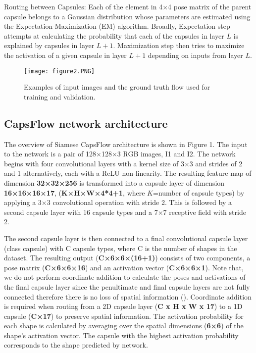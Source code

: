 \documentclass[11pt]{article}
\begin{document}
Routing between Capsules: Each of the element in
4×4 pose matrix of the parent capsule belongs to a Gaussian distribution whose parameters are estimated using the
Expectation-Maximization (EM) algorithm. Broadly, Expectation step attempts at calculating the probability that
each of the capsules in layer \(L\) is explained by capsules in
layer \(L + 1\). Maximization step then tries to maximize the
activation of a given capsule in layer \(L + 1\) depending on
inputs from layer \(L\).


\begin{figure}
\centering
\texttt{[image: figure2.PNG]}
\caption{Examples of input images and the ground truth
flow used for training and validation.}
\end{figure}

\subsection{CapsFlow network architecture}
The overview of Siamese CapsFlow architecture is
shown in Figure 1. The input to the network is a pair
of 128×128×3 RGB images, I1 and I2. The network
begins with four convolutional layers with a kernel size
of 3×3 and strides of 2 and 1 alternatively, each with
a ReLU non-linearity. The resulting feature map of dimension \textbf{32×32×256} is transformed into a capsule layer
of dimension \textbf{16×16×16×17}, (\textbf{K×H×W×4*4+1}, where
\(K\)=number of capsule types) by applying a 3×3 convolutional operation with stride 2. This is followed by a second
capsule layer with 16 capsule types and a 7×7 receptive field with stride 2.

The second capsule layer is then connected to a final
convolutional capsule layer (class capsule) with C capsule
types, where C is the number of shapes in the dataset. The
resulting output (\textbf{C×6×6×(16+1)}) consists of two components, a pose matrix (\textbf{C×6×6×16}) and an activation vector (\textbf{C×6×6×1}). Note that, we do not perform coordinate
addition to calculate the poses and activations of the final
capsule layer since the penultimate and final capsule layers
are not fully connected therefore there is no loss of spatial
information (\cite{5,4}). Coordinate addition is required when
routing from a 2D capsule layer (\textbf{C x H x W x 17}) to a 1D
capsule (\textbf{C×17}) to preserve spatial information. The activation probability for each shape is calculated by averaging
over the spatial dimensions (\textbf{6×6}) of the shape’s activation
vector. The capsule with the highest activation probability
corresponds to the shape predicted by network.
\end{document}
